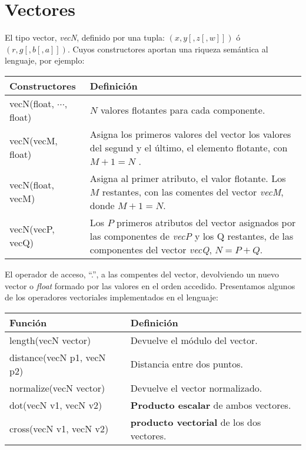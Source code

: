 \section{Vectores}
El tipo vector, \textit{vecN}, definido por una tupla: \((x, y[, z[, w]])\) ó \((r, g[, b[, a]])\). Cuyos constructores aportan una riqueza semántica al lenguaje, por ejemplo:
\begin{table}[H]
    \begin{tabularx}{\textwidth}{l|X}
      \toprule
      Constructores & Definición\\
      \midrule
      vecN(float, \(\cdots\), float) & \(N\) valores flotantes para cada componente.\\
      vecN(vecM, float) & Asigna los primeros valores del vector los valores del segund y el último, el elemento flotante, con \(M+1=N\) . \\
      vecN(float, vecM) & Asigna al primer atributo, el valor flotante. Los \(M\) restantes, con las comentes del vector \textit{vecM}, donde \(M+1=N\). \\
      vecN(vecP, vecQ) & Los \(P\) primeros atributos del vector asignados por las componentes de \textit{vecP} y los Q restantes, de las componentes del vector \textit{vecQ}, \(N = P + Q\). \\
      \bottomrule
    \end{tabularx}
\end{table}
El operador de acceso, \enquote{.}, a las compentes del vector, devolviendo un nuevo vector o \textit{float} formado por las valores en el orden accedido. Presentamos algunos de los operadores vectoriales implementados en el lenguaje:
\begin{table}[H]
    \begin{tabularx}{\textwidth}{l|X}
      \toprule
      Función & Definición\\
      \midrule
      length(vecN vector) & Devuelve el módulo del vector.\\
      distance(vecN p1, vecN p2) & Distancia entre dos puntos. \\
      normalize(vecN vector) & Devuelve el vector normalizado. \\
      dot(vecN v1, vecN v2) & \textbf{Producto escalar} de ambos vectores. \\
      cross(vecN v1, vecN v2) & \textbf{producto vectorial} de los dos vectores. \\
      \bottomrule
    \end{tabularx}
\end{table}


